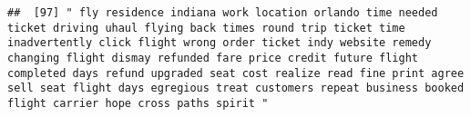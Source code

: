 \documentclass[
]{article}
\begin{document}
\begin{verbatim}
##  [97] " fly residence indiana work location orlando time needed ticket driving uhaul flying back times round trip ticket time inadvertently click flight wrong order ticket indy website remedy changing flight dismay refunded fare price credit future flight completed days refund upgraded seat cost realize read fine print agree sell seat flight days egregious treat customers repeat business booked flight carrier hope cross paths spirit "                                                                                                                                                                                                                                                                                                                                                                                                                                                                                                                                                                                                                                                                                                                                                                                                                                                                                                                                                                                                                                                                                                                                                                                                                                                                                                                                                

\end{verbatim}
\end{document}
